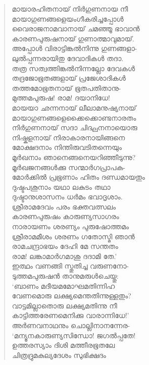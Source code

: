 \begin{verse}
മായാരഹിതനായ് നിര്‍ഗുണനായ നീ\\
മായാഗുണങ്ങളെയംഗീകരിച്ചപ്പോള്‍\\
വൈരാജനാമവാനായ് ചമഞ്ഞൂ ഭാവാന്‍\\
കാരണപുരുഷനായ് ഗുണാത്മാവുമായ്.\\
അപ്പോള്‍ വിരാട്ടിങ്കല്‍നിന്നു ഗുണങ്ങളാ-\\
ലുല്‍പ്പന്നരായിതു ദേവാദികള്‍ തദാ.\\
തത്ര സത്വത്തിങ്കല്‍നിന്നല്ലോ ദേവകള്‍\\
തദ്രജോഭൂതങ്ങളായ് പ്രജേശാദികള്‍\\
തത്തമോഭൂതനായ് ഭൂതപതിതാനു-\\
മുത്തമപുരുഷ! രാമ! ദയാനിധേ!\\
മായയാ ഛന്നനായ് ലീലാമനുഷ്യനായ്\\
മായാഗുണങ്ങളെക്കൈക്കൊണ്ടനാരതം\\
നിര്‍ഗുണനായ് സദാ ചിദ്ഘനനായൊരു\\
നിഷ്കളനായ് നിരാകാരനായിങ്ങനെ\\
മോക്ഷദനാം നിന്തിരുവടിതന്നെയും\\
മൂര്‍ഖനാം ഞാനെങ്ങനെയറിഞ്ഞീടുന്നു?\\
മൂര്‍ഖജനങ്ങള്‍ക്കു സന്മാര്‍ഗപ്രാപക-\\
മോര്‍ക്കില്‍ പ്രഭൂണാം ഹിതം ദണ്ഡമായതും\\
ദുഷ്ടപശൂനാം യഥാ ലകുടം തഥാ\\
ദുഷ്ടാനുശാസനം ധര്‍മം ഭവാദൃശാം.\\
ശ്രീരാമദേവം പരം ഭക്തവത്സലം\\
കാരണപുരുഷം കാരുണ്യസാഗരം\\
നാരായണം ശരണ്യം പുരുഷോത്തമം\\
ശ്രീരാമമീശം ശരണം ഗതോസ്മി ഞാന്‍\\
രാമചന്ദ്രാഭയം ദേഹി മേ സന്തതം\\
രാമ! ലങ്കാമാര്‍ഗമാശു ദദാമി തേ.’\\
ഇത്ഥം വണങ്ങി സ്തുതിച്ച വരുണനോ-\\
ടുത്തമപുരുഷന്‍ താനുമരുള്‍ചെയ്തു:\\
‘ബാണം മദീയമമോഘമതിന്നിഹ\\
വേണമൊരു ലക്ഷ്യമെന്തതിന്നുള്ളതും?\\
വാട്ടമില്ലാതൊരു ലക്ഷ്യമതിന്നു നീ\\
കാട്ടിത്തരേണമെനിക്കു വാരാന്നിധേ!’\\
അര്‍ണവനാഥനും ചൊല്ലിനാനന്നേര-\\
‘മന്യൂനകാരുണ്യസിന്ധോ! ജഗല്‍പ്പതേ!\\
ഉത്തരസ്യാം ദിശി മത്തീരഭൂതലേ\\
ചിത്രദ്രുമകുല്യദേശം സുഭിക്ഷദം\\

\end{verse}
